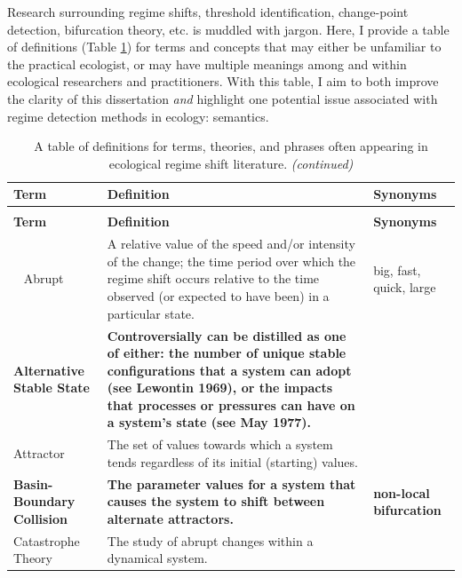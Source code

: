 \documentclass[print]{nuthesis}
\begin{document}
Research surrounding regime shifts, threshold identification, change-point detection, bifurcation theory, etc. is muddled with jargon. Here, I provide a table of definitions (Table \ref{tab:glossary}) for terms and concepts that may either be unfamiliar to the practical ecologist, or may have multiple meanings among and within ecological researchers and practitioners. With this table, I aim to both improve the clarity of this dissertation \emph{and} highlight one potential issue associated with regime detection methods in ecology: semantics.

\newpage
\begin{landscape}
\begingroup\fontsize{10}{12}\selectfont
\begin{longtable}{>{\raggedright\arraybackslash}p{12em}>{\raggedright\arraybackslash}p{35em}>{\raggedright\arraybackslash}p{8em}}
\caption{\label{tab:glossary}A table of definitions for terms, theories, and phrases often appearing in ecological regime shift literature.}\\
\toprule
\textbf{Term} & \textbf{Definition} & \textbf{Synonyms}\\
\midrule
\endfirsthead
\caption[]{\label{tab:glossary}A table of definitions for terms, theories, and phrases often appearing in ecological regime shift literature. \textit{(continued)}}\\
\toprule
\textbf{Term} & \textbf{Definition} & \textbf{Synonyms}\\
\midrule
\endhead
\
\endfoot
\bottomrule
\endlastfoot
Abrupt & A relative value of the speed and/or intensity of the change; the time period over which the regime shift occurs relative to the time observed (or expected to have been) in a particular state. & big, fast, quick, large\\
\textbf{Alternative Stable State} & \textbf{Controversially can be distilled as one of either: the number of unique stable configurations that a system can adopt (see Lewontin 1969), or the impacts that processes or pressures can have on a system's state (see May 1977).} & \textbf{}\\
Attractor & The set of values towards which a system tends regardless of its initial (starting) values. & \\
\textbf{Basin-Boundary Collision} & \textbf{The parameter values for a system that causes the system to shift between alternate attractors.} & \textbf{non-local bifurcation}\\
Catastrophe Theory & The study of abrupt changes within a dynamical system. & \\

\end{longtable}
\end{landscape}
\end{document}
